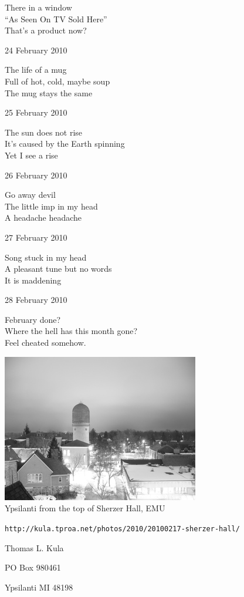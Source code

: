 \documentclass[12pt]{article}
\begin{document}
There in a window \\
``As Seen On TV Sold Here'' \\
That's a product now?

24 February 2010

The life of a mug \\
Full of hot, cold, maybe soup \\
The mug stays the same

25 February 2010

The sun does not rise \\
It's caused by the Earth spinning \\
Yet I see a rise

26 February 2010

Go away devil \\
The little imp in my head \\
A headache headache

27 February 2010

Song stuck in my head \\
A pleasant tune but no words \\
It is maddening

28 February 2010

February done? \\
Where the hell has this month gone? \\
Feel cheated somehow.

\newpage

\begin{center}
\includegraphics{ypsi-from-sherzer.jpg} \\[1cm]

Ypsilanti from the top of Sherzer Hall, EMU  

\small{{\tt http://kula.tproa.net/photos/2010/20100217-sherzer-hall/ }}

\end{center}

\newpage

\thispagestyle{empty}
\vspace*{14cm}
\begin{sideways}
\Large{Thomas L. Kula}
\end{sideways}
\begin{sideways}
\Large{PO Box 980461}
\end{sideways}
\begin{sideways}
\Large{Ypsilanti MI 48198}
\end{sideways}
\end{document}
